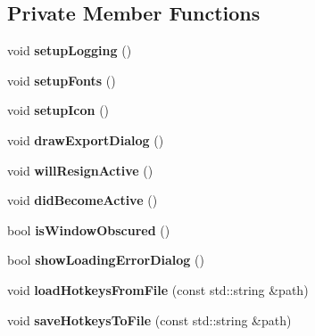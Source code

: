 \subsection*{Private Member Functions}
\begin{DoxyCompactItemize}
\item 
\mbox{\label{classpepr3d_1_1_main_application_ab109e61da72a727f217fa9e715642c42}} 
void {\bfseries setup\+Logging} ()
\item 
\mbox{\label{classpepr3d_1_1_main_application_a2e368d949ee47ce6466d2abd992e9e9f}} 
void {\bfseries setup\+Fonts} ()
\item 
\mbox{\label{classpepr3d_1_1_main_application_ac2ab8320c6d5bc477b5b44a518e32dbd}} 
void {\bfseries setup\+Icon} ()
\item 
\mbox{\label{classpepr3d_1_1_main_application_a25c7fd779219357ed9eccea0e2a4dea0}} 
void {\bfseries draw\+Export\+Dialog} ()
\item 
\mbox{\label{classpepr3d_1_1_main_application_a3b26419f0dc484c466b4b65686cb09d5}} 
void {\bfseries will\+Resign\+Active} ()
\item 
\mbox{\label{classpepr3d_1_1_main_application_a2692d734374d2a74c63b45f0856baf1a}} 
void {\bfseries did\+Become\+Active} ()
\item 
\mbox{\label{classpepr3d_1_1_main_application_a5a9f2357108cc7c32b640559723f5270}} 
bool {\bfseries is\+Window\+Obscured} ()
\item 
\mbox{\label{classpepr3d_1_1_main_application_a8c723a7f716f24de66df40affcd63add}} 
bool {\bfseries show\+Loading\+Error\+Dialog} ()
\item 
\mbox{\label{classpepr3d_1_1_main_application_a8792c0f1e1c151da1d7fa2b1ff05643d}} 
void {\bfseries load\+Hotkeys\+From\+File} (const std\+::string \&path)
\item 
\mbox{\label{classpepr3d_1_1_main_application_ab0fb0391cc13ce9fab835893246a945b}} 
void {\bfseries save\+Hotkeys\+To\+File} (const std\+::string \&path)
\end{DoxyCompactItemize}

